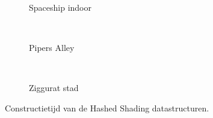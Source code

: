 \begin{figure}[t]
\begin{minipage}[t]{0.5\textwidth}
\begin{adjustbox}{minipage=\textwidth, scale=0.55}
    \begin{subfigure}[b]{1.6\textwidth}
      \centering
      \def\svgwidth{\textwidth}
      
      \caption{Spaceship indoor}
      \vspace{4pt}
      \label{fig:hs-ns-construction-time:indoor}
    \end{subfigure}
  \end{adjustbox} \\
  \begin{adjustbox}{minipage=\textwidth, scale=0.55}
    \begin{subfigure}[b]{1.6\textwidth}
      \centering
      \def\svgwidth{\textwidth}
      
      \caption{Pipers Alley}
      \vspace{4pt}
      \label{fig:hs-ns-construction-time:alley}
    \end{subfigure}
  \end{adjustbox} \\
  \begin{adjustbox}{minipage=\textwidth, scale=0.55}
    \begin{subfigure}[b]{1.6\textwidth}
      \centering
      \def\svgwidth{\textwidth}
      
      \caption{Ziggurat stad}
      \label{fig:hs-ns-construction-time:city}
    \end{subfigure}
  \end{adjustbox}
  \caption{\small Constructietijd van de Hashed Shading datastructuren.}
  \label{fig:hs-ns-construction-time}
  \end{minipage} 
\end{figure}

